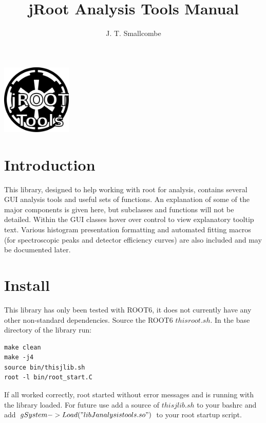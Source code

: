 \documentclass[a4paper,10pt]{article}
\title{jRoot Analysis Tools Manual}
\author{J. T. Smallcombe}
\begin{document}
\maketitle
\begin{center}
\includegraphics[width=0.25\textwidth]{Emblem.png}
\end{center}
\tableofcontents
\newpage
\section{Introduction}
This library, designed to help working with root for analysis, contains several GUI analysis tools and useful sets of functions. An explanation of some of the major components is given here, but subclasses and functions will not be detailed.
Within the GUI classes hover over control to view explanatory tooltip text.
Various histogram presentation formatting and automated fitting macros (for spectroscopic peaks and detector efficiency curves) are also included and may be documented later. 

\section{Install}
This library has only been tested with ROOT6, it does not currently have any other non-standard dependencies.
Source the ROOT6 $thisroot.sh$.
In the base directory of the library run:
\lstset{language=bash}
\begin{lstlisting}
make clean
make -j4
source bin/thisjlib.sh
root -l bin/root_start.C
\end{lstlisting}
If all worked correctly, root started without error messages and is running with the library loaded.
For future use add a source of $thisjlib.sh$ to your bashrc and add $gSystem->Load("libJanalysistools.so")$ to your root startup script.
\end{document}
